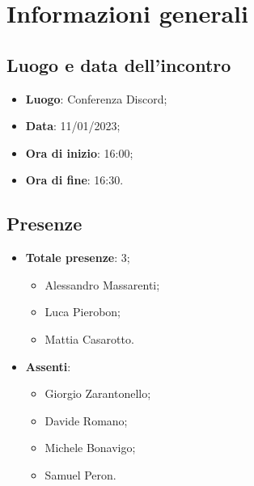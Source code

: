 \section{Informazioni generali}

    \subsection{Luogo e data dell'incontro}
    \begin{itemize}
        \item \textbf{Luogo}: Conferenza Discord;
        \item \textbf{Data}: 11/01/2023;
        \item \textbf{Ora di inizio}: 16:00;
        \item \textbf{Ora di fine}: 16:30.
    \end{itemize}
    \subsection{Presenze}
    \begin{itemize}
        \item \textbf{Totale presenze}: 3;
        \begin{itemize}
            \item Alessandro Massarenti;
            \item Luca Pierobon;
            \item Mattia Casarotto.
        \end{itemize}
        \item \textbf{Assenti}:
        \begin{itemize}
            \item Giorgio Zarantonello;
            \item Davide Romano;
            \item Michele Bonavigo;
            \item Samuel Peron.
        \end{itemize}
    \end{itemize}